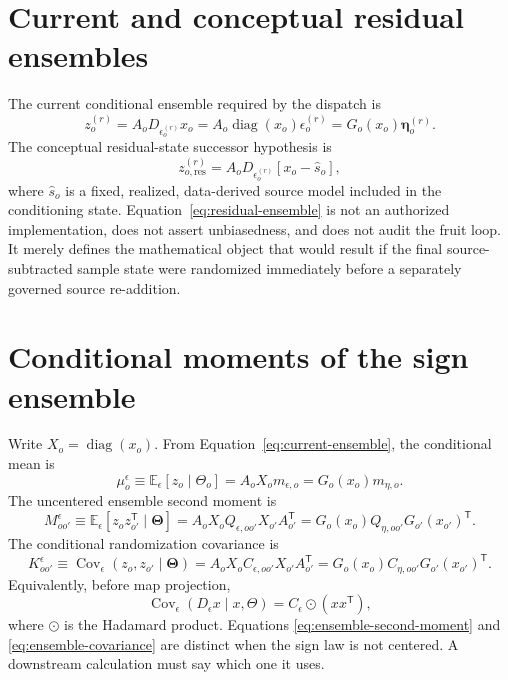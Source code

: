 \documentclass[11pt]{article}
\newcommand{\E}{\mathbb{E}}
\newcommand{\Cov}{\operatorname{Cov}}
\newcommand{\diag}{\operatorname{diag}}
\newcommand{\etaV}{\boldsymbol{\eta}}
\newcommand{\ThetaV}{\boldsymbol{\Theta}}
\begin{document}
\section{Current and conceptual residual ensembles}

The current conditional ensemble required by the dispatch is
\begin{equation}
  z_o^{(r)}
  =A_oD_{\epsilon_o^{(r)}}x_o
  =A_o\diag(x_o)\epsilon_o^{(r)}
  =G_o(x_o)\etaV_o^{(r)}.
  \label{eq:current-ensemble}
\end{equation}
The conceptual residual-state successor hypothesis is
\begin{equation}
  z_{o,\mathrm{res}}^{(r)}
  =A_oD_{\epsilon_o^{(r)}}[x_o-\widehat s_o],
  \label{eq:residual-ensemble}
\end{equation}
where $\widehat s_o$ is a fixed, realized, data-derived source model included
in the conditioning state.  Equation~\eqref{eq:residual-ensemble} is not an
authorized implementation, does not assert unbiasedness, and does not audit
the fruit loop.  It merely defines the mathematical object that would result
if the final source-subtracted sample state were randomized immediately before
a separately governed source re-addition.

\section{Conditional moments of the sign ensemble}

Write $X_o=\diag(x_o)$.  From
Equation~\eqref{eq:current-ensemble}, the conditional mean is
\begin{equation}
  \mu_o^{\epsilon}
  \equiv\E_\epsilon[z_o\mid\Theta_o]
  =A_oX_om_{\epsilon,o}
  =G_o(x_o)m_{\eta,o}.
  \label{eq:ensemble-mean}
\end{equation}
The uncentered ensemble second moment is
\begin{equation}
  M_{oo'}^{\epsilon}
  \equiv\E_\epsilon[z_oz_{o'}^{\mathsf T}\mid\ThetaV]
  =A_oX_oQ_{\epsilon,oo'}X_{o'}A_{o'}^{\mathsf T}
  =G_o(x_o)Q_{\eta,oo'}G_{o'}(x_{o'})^{\mathsf T}.
  \label{eq:ensemble-second-moment}
\end{equation}
The conditional randomization covariance is
\begin{equation}
  K_{oo'}^{\epsilon}
  \equiv\Cov_\epsilon(z_o,z_{o'}\mid\ThetaV)
  =A_oX_oC_{\epsilon,oo'}X_{o'}A_{o'}^{\mathsf T}
  =G_o(x_o)C_{\eta,oo'}G_{o'}(x_{o'})^{\mathsf T}.
  \label{eq:ensemble-covariance}
\end{equation}
Equivalently, before map projection,
\begin{equation}
  \Cov_\epsilon(D_\epsilon x\mid x,\Theta)
  =C_\epsilon\odot(xx^{\mathsf T}),
  \label{eq:hadamard-randomization}
\end{equation}
where $\odot$ is the Hadamard product.  Equations
\eqref{eq:ensemble-second-moment} and \eqref{eq:ensemble-covariance} are
distinct when the sign law is not centered.  A downstream calculation must
say which one it uses.
\end{document}
